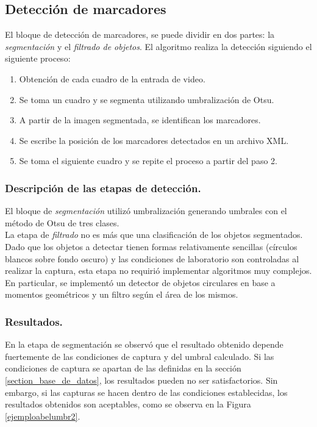 \subsection{Detección de marcadores}
El bloque de detección de marcadores, se puede dividir en dos partes: la \textit{segmentación} y el \textit{filtrado de objetos}.
%
El algoritmo realiza la detección siguiendo el siguiente proceso:
%
\begin{enumerate}
  \item Obtención de cada cuadro de la entrada de video.
  \item Se toma un cuadro y se segmenta utilizando umbralización de Otsu.
  \item A partir de la imagen segmentada, se identifican los marcadores.
  \item Se escribe la posición de los marcadores detectados en un archivo XML.
  \item Se toma el siguiente cuadro y se repite el proceso a partir del paso 2.
\end{enumerate}
\vspace{-0.4cm} 
\subsubsection{Descripción de las etapas de detección.}
El bloque de \textit{segmentación} utilizó umbralización generando umbrales con el método de Otsu\cite{otsu} de tres clases.\\
%
La etapa de \textit{filtrado} no es más que una clasificación de los objetos segmentados. Dado que los objetos a detectar tienen formas relativamente sencillas (círculos blancos sobre fondo oscuro) y las condiciones de laboratorio son controladas al realizar la captura, esta etapa no requirió implementar algoritmos muy complejos. En particular, se implementó un detector de objetos circulares en base a momentos geométricos\cite{imageMoments} y un filtro según el área de los mismos.
\vspace{-0.3cm} 
\subsubsection{Resultados.}
En la etapa de segmentación se observó que el resultado obtenido depende fuertemente de las condiciones de captura y del umbral calculado. Si las condiciones de captura se apartan de las definidas en la sección \ref{section_base_de_datos}, los resultados pueden no ser satisfactorios. Sin embargo, si las capturas se hacen dentro de las condiciones establecidas, los resultados obtenidos son aceptables, como se observa en la Figura \ref{ejemploabelumbr2}.

